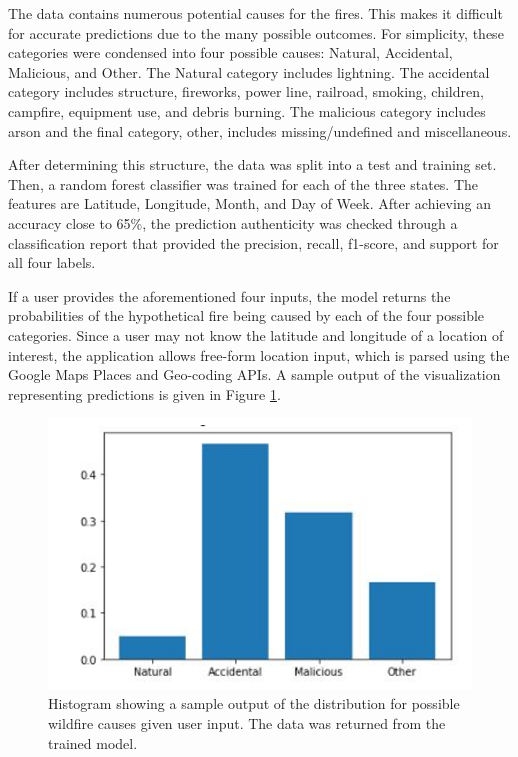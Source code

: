 \documentclass[conference]{IEEEtran}
\begin{document}
The data contains numerous potential causes for the fires. This makes it difficult for accurate predictions due to the many possible outcomes. For simplicity, these categories were condensed into four possible causes: Natural, Accidental, Malicious, and Other. The Natural category includes lightning. The accidental category includes structure, fireworks, power line, railroad, smoking, children, campfire, equipment use, and debris burning. The malicious category includes arson and the final category, other, includes missing/undefined and miscellaneous. \par

After determining this structure, the data was split into a test and training set. Then, a random forest classifier was trained for each of the three states. The features are Latitude, Longitude, Month, and Day of Week. After achieving an accuracy close to 65\%, the prediction authenticity was checked through a classification report that provided the precision, recall, f1-score, and support for all four labels. \par

If a user provides the aforementioned four inputs, the model returns the probabilities of the hypothetical fire being caused by each of the four possible categories. Since a user may not know the latitude and longitude of a location of interest, the application allows free-form location input, which is parsed using the Google Maps Places and Geo-coding APIs. A sample output of the visualization representing predictions is given in Figure \ref{fig:model_predictions}. \par 

\begin{figure}
    \centering
    \includegraphics{img/sample_output.PNG}
    \caption{Histogram showing a sample output of the distribution for possible wildfire causes given user input. The data was returned from the trained model.}
    \label{fig:model_predictions}
\end{figure}
\end{document}
